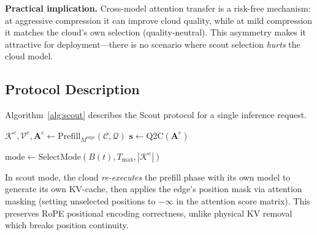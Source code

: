 \documentclass[conference]{IEEEtran}
\begin{document}
\textbf{Practical implication.}
Cross-model attention transfer is a risk-free mechanism: at aggressive compression it can improve cloud quality, while at mild compression it matches the cloud's own selection (quality-neutral).
This asymmetry makes it attractive for deployment---there is no scenario where scout selection \emph{hurts} the cloud model.

\subsection{Protocol Description}

Algorithm~\ref{alg:scout} describes the Scout protocol for a single inference request.

\begin{algorithm}[t]
\caption{Scout Protocol}
\label{alg:scout}
\SetAlgoLined
{}

$\mathcal{K}^e, \mathcal{V}^e, \mathbf{A}^e \leftarrow \text{Prefill}_{M^{\text{edge}}}(\mathcal{C}, \mathcal{Q})$\;
$\mathbf{s} \leftarrow \text{Q2C}(\mathbf{A}^e)$ 

$\text{mode} \leftarrow \text{SelectMode}(B(t), T_{\max}, |\mathcal{K}^e|)$\;

\end{algorithm}

In scout mode, the cloud \emph{re-executes} the prefill phase with its own model to generate its own KV-cache, then applies the edge's position mask via attention masking (setting unselected positions to $-\infty$ in the attention score matrix).
This preserves RoPE positional encoding correctness, unlike physical KV removal which breaks position continuity.
\end{document}
